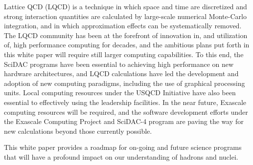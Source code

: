 Lattice QCD (LQCD) is a technique in which space and time are
discretized and strong interaction quantities are calculated by
large-scale numerical Monte-Carlo integration, and in which
approximation effects can be systematically removed. The LQCD community
has been at the forefront of innovation in, and utilization of, high performance computing  for
decades, and the ambitious plans put forth in this white paper will
require still larger computing capabilities. To this end, the SciDAC
programs have been essential to achieving high performance on new hardware
architectures, and LQCD calculations have led the development and
adoption of new computing paradigms, including the use of graphical
processing units. Local computing resources under the USQCD Initiative
have also been essential to effectively using the
leadership facilities. In the near future, Exascale computing resources
will be required, and the software development efforts under the
Exascale Computing Project and SciDAC-4 program are paving the way for new calculations
beyond those currently possible.


This white paper provides a roadmap for on-going and future science
programs that will have a profound impact on our understanding of hadrons and nuclei.

